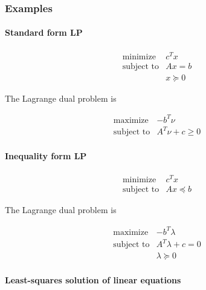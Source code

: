 \subsubsection{Examples}

\paragraph{Standard form LP}

\begin{equation}
\begin{array}{ll}
\mbox{minimize} & c^T x
\\
\mbox{subject to} & Ax = b
\\
& x \succeq 0
\end{array}
\end{equation}

The Lagrange dual problem is

\begin{equation}
\begin{array}{ll}
\mbox{maximize} & -b^T \nu
\\
\mbox{subject to} & A^T \nu + c \geq0
\end{array}
\end{equation}

\paragraph{Inequality form LP}

\begin{equation}
\begin{array}{ll}
\mbox{minimize} & c^T x
\\
\mbox{subject to} & Ax \preceq b
\end{array}
\end{equation}

The Lagrange dual problem is

\begin{equation}
\begin{array}{ll}
\mbox{maximize} & -b^T \lambda
\\
\mbox{subject to} & A^T \lambda + c = 0
\\
& \lambda \succeq 0
\end{array}
\end{equation}


\paragraph{Least-squares solution of linear equations}


